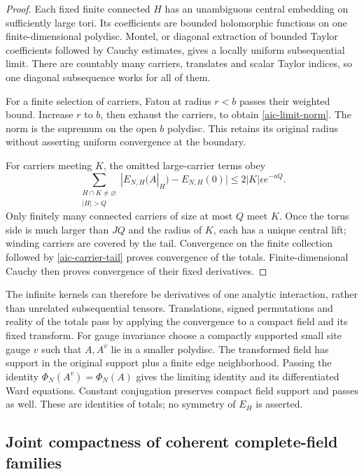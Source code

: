 \begin{proof}
Each fixed finite connected \(H\) has an unambiguous central
embedding on sufficiently large tori. Its coefficients are bounded
holomorphic functions on one finite-dimensional polydisc. Montel,
or diagonal extraction of bounded Taylor coefficients followed by
Cauchy estimates, gives a locally uniform subsequential limit.
There are countably many carriers, translates and scalar Taylor
indices, so one diagonal subsequence works for all of them.

For a finite selection of carriers, Fatou at radius \(r<b\)
passes their weighted bound. Increase \(r\) to \(b\), then
exhaust the carriers, to obtain \eqref{aic-limit-norm}.
The norm is the supremum on the open \(b\) polydisc. This
retains its original radius without asserting uniform convergence
at the boundary.

For carriers meeting \(K\), the omitted large-carrier terms obey
\begin{equation}
 \sum_{\substack{H\cap K\ne\varnothing\\|H|>Q}}
 |E_{N,H}(A|_H)-E_{N,H}(0)|
       \le2|K|\epsilon e^{-aQ}.
 \label{aic-carrier-tail}
\end{equation}
Only finitely many connected carriers of size at most \(Q\)
meet \(K\). Once the torus side is much larger than \(JQ\)
and the radius of \(K\), each has a unique central lift;
winding carriers are covered by the tail. Convergence on the
finite collection followed by \eqref{aic-carrier-tail} proves
convergence of the totals. Finite-dimensional Cauchy then
proves convergence of their fixed derivatives.
\end{proof}

The infinite kernels can therefore be derivatives of one analytic
interaction, rather than unrelated subsequential tensors.
Translations, signed permutations and reality of the totals pass
by applying the convergence to a compact field and its fixed
transform. For gauge invariance choose a compactly supported
small site gauge \(v\) such that \(A,A^v\) lie in a smaller
polydisc. The transformed field has support in the original
support plus a finite edge neighborhood. Passing the identity
\(\Phi_N(A^v)=\Phi_N(A)\) gives the limiting identity and
its differentiated Ward equations. Constant conjugation preserves
compact field support and passes as well. These are identities
of totals; no symmetry of \(E_H\) is asserted.

\subsection{Joint compactness of coherent complete-field families}
\label{aic-background-section}

